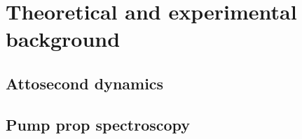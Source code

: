 \chapter{Theoretical and experimental background} %
\label{cha:theoretical_background}
\section{Attosecond dynamics} %
\label{sec:attosecond_dynamics}


\section{Pump prop spectroscopy} %
\label{sec:pump_prop_spectroscopy}


